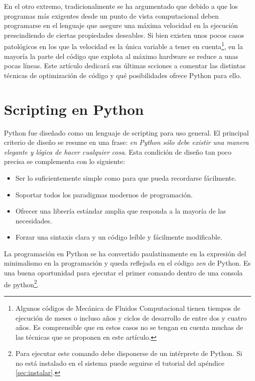 \documentclass[a4paper,10pt]{article}
\begin{document}
En el otro extremo, tradicionalmente se ha argumentado que debido a
que los programas más exigentes desde un punto de vista computacional
deben programarse en el lenguaje que asegure una máxima velocidad en
la ejecución prescindiendo de ciertas propiedades deseables. Si bien
existen unos pocos casos patológicos en los que la velocidad es la
única variable a tener en cuenta\footnote{Algunos códigos de Mecánica
  de Fluidos Computacional tienen tiempos de ejecución de meses o
  incluso años y ciclos de desarrollo de entre dos y cuatro años.  Es
  comprensible que en estos casos no se tengan en cuenta muchas de las
  técnicas que se proponen en este artículo.}, en la mayoría la parte
del código que explota al máximo hardware se reduce a unas pocas
líneas. Este artículo dedicará sus últimas scciones a comentar las
distintas técnicas de optimización de código y qué posibilidades
ofrece Python para ello.


\section{Scripting en Python}

Python fue diseñado como un lenguaje de scripting para uso
general. El principal criterio de diseño se resume en una frase:
\emph{en Python sólo debe existir una manera elegante y lógica de
  hacer cualquier cosa}. Esta condición de diseño tan poco precisa se
complementa con lo siguiente:

\begin{itemize}
\item Ser lo suficientemente simple como para que pueda recordarse
  fácilmente.
\item Soportar todos los paradigmas modernos de programación.
\item Ofrecer una librería estándar amplia que responda a la mayoría
  de las necesidades.
\item Forzar una sintaxis clara y un código leíble y fácilmente
  modificable.
\end{itemize}

La programación en Python se ha convertido paulatinamente en la
expresión del minimalismo en la programación y queda reflejada en el
código \emph{zen} de Python. Es una buena oportunidad para ejecutar el
primer comando dentro de una consola de python\footnote{Para ejecutar
  este comando debe disponerse de un intérprete de Python. Si no está
  instalado en el sistema puede seguirse el tutorial del apéndice
  \ref{sec:instalar}.}.
\end{document}
